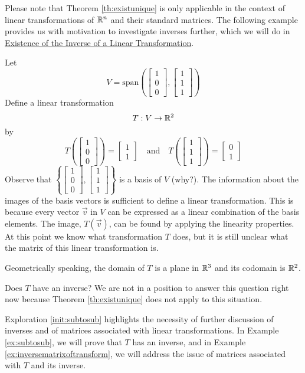 \documentclass{ximera}
\begin{document}
Please note that Theorem \ref{th:existunique} is only applicable in the context of linear transformations of $\mathbb{R}^n$ and their standard matrices.  The following example provides us with motivation to investigate inverses further, which we will do in \href{https://ximera.osu.edu/oerlinalg/LinearAlgebra/LTR-0035/main}{Existence of the Inverse of a Linear Transformation}.

\begin{exploration}\label{init:subtosub}
Let $$V=\text{span}\left(\begin{bmatrix}1\\0\\0\end{bmatrix}, \begin{bmatrix}1\\1\\1\end{bmatrix}\right)$$
Define a linear transformation $$T:V\rightarrow \mathbb{R}^2$$
by $$T\left(\begin{bmatrix}1\\0\\0\end{bmatrix}\right)=\begin{bmatrix}1\\1\end{bmatrix}\quad \text{and} \quad T\left(\begin{bmatrix}1\\1\\1\end{bmatrix}\right)=\begin{bmatrix}0\\1\end{bmatrix}$$
Observe that $\left\{\begin{bmatrix}1\\0\\0\end{bmatrix}, \begin{bmatrix}1\\1\\1\end{bmatrix}\right\}$ is a basis of $V$ (why?). The information about the images of the basis vectors is sufficient to define a linear transformation.  This is because every vector $\vec{v}$ in $V$ can be expressed as a linear combination of the basis elements.  The image, $T(\vec{v})$, can be found by applying the linearity properties.
At this point we know what transformation $T$ does, but it is still unclear what the matrix of this linear transformation is.

Geometrically speaking, the domain of $T$ is a plane in $\mathbb{R}^3$ and its codomain is $\mathbb{R}^2$.  

Does $T$ have an inverse?  We are not in a position to answer this question right now because Theorem \ref{th:existunique} does not apply to this situation. 
\end{exploration}
Exploration \ref{init:subtosub} highlights the necessity of further discussion of inverses and of matrices associated with linear transformations.  In Example \ref{ex:subtosub}, we will prove that $T$ has an inverse, and in Example \ref{ex:inversematrixoftransform}, we will address the issue of matrices associated with $T$ and its inverse.
\end{document}
